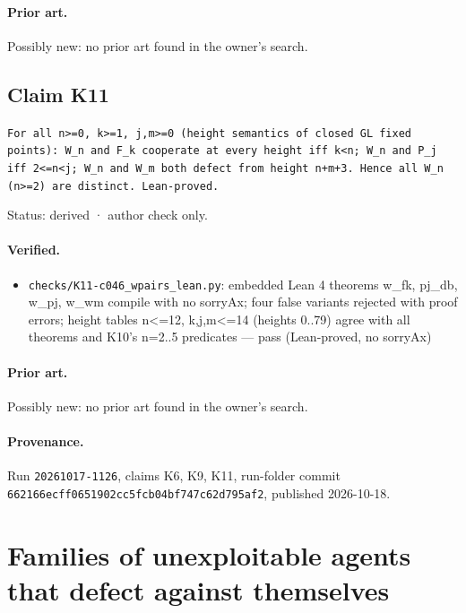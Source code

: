 \documentclass{article}
\begin{document}
\paragraph{Prior art.} Possibly new: no prior art found in the owner's search.

\subsection*{Claim K11}

\texttt{For all n\textgreater{}=0, k\textgreater{}=1, j,m\textgreater{}=0 (height semantics of closed GL fixed points): W\_n and F\_k cooperate at every height iff k\textless{}n; W\_n and P\_j iff 2\textless{}=n\textless{}j; W\_n and W\_m both defect from height n+m+3. Hence all W\_n (n\textgreater{}=2) are distinct. Lean-proved.}

Status: derived · author check only.

\paragraph{Verified.}
\begin{itemize}
\item \texttt{checks/K11-c046\_wpairs\_lean.py}: embedded Lean 4 theorems w\_fk, pj\_db, w\_pj, w\_wm compile with no sorryAx; four false variants rejected with proof errors; height tables n\textless{}=12, k,j,m\textless{}=14 (heights 0..79) agree with all theorems and K10's n=2..5 predicates --- pass (Lean-proved, no sorryAx)
\end{itemize}

\paragraph{Prior art.} Possibly new: no prior art found in the owner's search.

\paragraph{Provenance.}
Run \texttt{20261017-1126}, claims K6, K9, K11, run-folder commit \texttt{662166ecff0651902cc5fcb04bf747c62d795af2}, published 2026-10-18.

\section{Families of unexploitable agents that defect against themselves}
\label{sec:gate-families}
\end{document}
